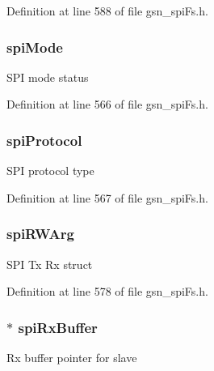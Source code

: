 Definition at line 588 of file gsn\_\-spiFs.h.

\hypertarget{a00233_a222e972463285c6028dbe0b209416401}{
\subsubsection[{spiMode}]{ {\bf spiMode}}}
\label{a00233_a222e972463285c6028dbe0b209416401}
SPI mode status 

Definition at line 566 of file gsn\_\-spiFs.h.

\hypertarget{a00233_ac72c0246af1fda25902e537d6bf7172c}{
\subsubsection[{spiProtocol}]{ {\bf spiProtocol}}}
\label{a00233_ac72c0246af1fda25902e537d6bf7172c}
SPI protocol type 

Definition at line 567 of file gsn\_\-spiFs.h.

\hypertarget{a00233_ae5d2dc9000a0a784dfad8020cc9bd8a5}{
\subsubsection[{spiRWArg}]{ {\bf spiRWArg}}}
\label{a00233_ae5d2dc9000a0a784dfad8020cc9bd8a5}
SPI Tx Rx struct 

Definition at line 578 of file gsn\_\-spiFs.h.

\hypertarget{a00233_aa07b66f7f4a73b04e5ffaf3f29b4b414}{
\subsubsection[{spiRxBuffer}]{$\ast$ {\bf spiRxBuffer}}}
\label{a00233_aa07b66f7f4a73b04e5ffaf3f29b4b414}
Rx buffer pointer for slave 

